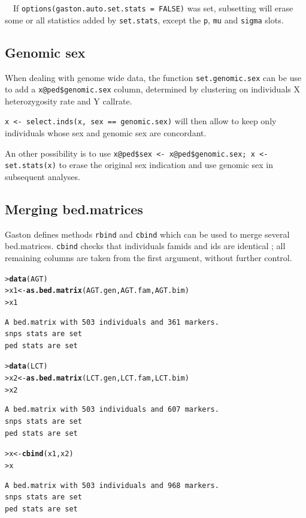 \documentclass{article}\usepackage[]{graphicx}\usepackage[]{color}
\makeatletter
\newcommand{\hlstd}[1]{\textcolor[rgb]{0.345,0.345,0.345}{#1}}%
\newcommand{\hlkwb}[1]{\textcolor[rgb]{0.69,0.353,0.396}{#1}}%
\newcommand{\hlkwd}[1]{\textcolor[rgb]{0.737,0.353,0.396}{\textbf{#1}}}%
\newenvironment{kframe}{%
 \def\at@end@of@kframe{}%
 \ifinner\ifhmode%
  \def\at@end@of@kframe{\end{minipage}}%
  \begin{minipage}{\columnwidth}%
 \fi\fi%
 \def\FrameCommand##1{\hskip\@totalleftmargin \hskip-\fboxsep
 \colorbox{shadecolor}{##1}\hskip-\fboxsep
     \hskip-\linewidth \hskip-\@totalleftmargin \hskip\columnwidth}%
 \MakeFramed {\advance\hsize-\width
   \@totalleftmargin\z@ \linewidth\hsize
   \@setminipage}}%
 {\par\unskip\endMakeFramed%
 \at@end@of@kframe}
\newenvironment{knitrout}{}{} %
\makeatother
\begin{document}
  \ \ If \verb!options(gaston.auto.set.stats = FALSE)!
  was set, subsetting will erase some or all statistics added by \verb!set.stats!,
  except the \verb!p!, \verb!mu! and \verb!sigma! slots. 

\subsection{Genomic sex}
  When dealing with genome wide data,
  the function \verb!set.genomic.sex! can be use to add a \verb!x@ped$genomic.sex! column,
  determined by clustering on individuals X heterozygosity rate and Y callrate.
 
  \verb!x <- select.inds(x, sex == genomic.sex)! will then allow to keep only individuals 
  whose sex and genomic sex are concordant.

  An other possibility is to use \verb!x@ped$sex <- x@ped$genomic.sex; x <- set.stats(x)! 
  to erase the original sex indication and use genomic sex in subsequent analyses.

\subsection{Merging bed.matrices}

  Gaston defines methods \verb!rbind! and \verb!cbind! which can be used to merge several
  bed.matrices. \verb!cbind! checks that individuals famids and ids are identical ; all remaining
  columns are taken from the first argument, without further control.

\begin{knitrout}
\color{fgcolor}\begin{kframe}
\begin{alltt}
\hlstd{> }\hlkwd{data}\hlstd{(AGT)}
\hlstd{> }\hlstd{x1} \hlkwb{<-} \hlkwd{as.bed.matrix}\hlstd{(AGT.gen, AGT.fam, AGT.bim)}
\hlstd{> }\hlstd{x1}
\end{alltt}
\begin{verbatim}
A bed.matrix with 503 individuals and 361 markers.
snps stats are set
ped stats are set
\end{verbatim}
\begin{alltt}
\hlstd{> }\hlkwd{data}\hlstd{(LCT)}
\hlstd{> }\hlstd{x2} \hlkwb{<-} \hlkwd{as.bed.matrix}\hlstd{(LCT.gen, LCT.fam, LCT.bim)}
\hlstd{> }\hlstd{x2}
\end{alltt}
\begin{verbatim}
A bed.matrix with 503 individuals and 607 markers.
snps stats are set
ped stats are set
\end{verbatim}
\begin{alltt}
\hlstd{> }\hlstd{x} \hlkwb{<-} \hlkwd{cbind}\hlstd{(x1,x2)}
\hlstd{> }\hlstd{x}
\end{alltt}
\begin{verbatim}
A bed.matrix with 503 individuals and 968 markers.
snps stats are set
ped stats are set
\end{verbatim}
\end{kframe}
\end{knitrout}
\end{document}
